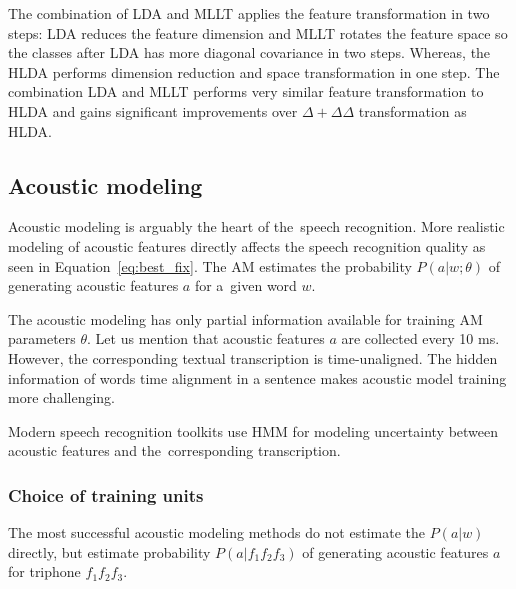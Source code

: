 {The combination of \ac{LDA} and \ac{MLLT} applies the feature transformation in two steps: \ac{LDA} reduces the feature dimension and \ac{MLLT} rotates the feature space so the classes after \ac{LDA} has more diagonal covariance in two steps.\cite{gopinath1998maximum}
Whereas, the \ac{HLDA} performs dimension reduction and space transformation in one step.\cite{gales1999semi}
The combination \ac{LDA} and \ac{MLLT} performs very similar feature transformation to \ac{HLDA}
and gains significant improvements over $\Delta+\Delta\Delta$ transformation 
as \ac{HLDA}\cite{gales1999semi}\cite{gopinath1998maximum}.


\subsection{Acoustic modeling}
\label{sub:am}
Acoustic modeling is arguably the heart of the~speech recognition.
More realistic modeling of acoustic features directly affects the speech recognition quality as seen in Equation~\ref{eq:best_fix}. 
The \ac{AM} estimates the probability $P(a|w; \theta)$ of generating acoustic features $a$ for a~given word $w$.

The acoustic modeling has only partial information available for training \ac{AM} parameters $\theta$.
Let us mention that acoustic features $a$ are collected every 10 ms.
However, the corresponding textual transcription is time-unaligned.
The hidden information of words time alignment in a sentence makes acoustic model training more challenging.

Modern speech recognition toolkits use \acl{HMM}
for modeling uncertainty between acoustic features and the~corresponding transcription. 

\subsubsection*{Choice of training units}
The most successful acoustic modeling methods do not estimate the $P(a|w)$ directly, but estimate probability $P(a|f_1f_2f_3)$ of generating acoustic features $a$ for triphone $f_1f_2f_3$.

}
